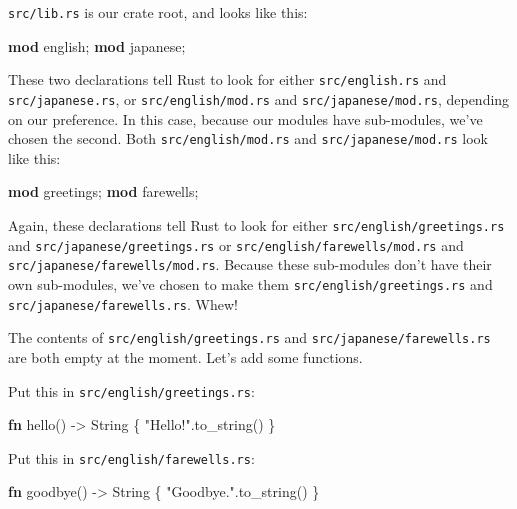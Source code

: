 \documentclass[a4paper,]{book}
\newenvironment{Shaded}{\begin{snugshade}}{\end{snugshade}}
\newcommand{\KeywordTok}[1]{\textcolor[rgb]{0.13,0.29,0.53}{\textbf{{#1}}}}
\newcommand{\StringTok}[1]{\textcolor[rgb]{0.31,0.60,0.02}{{#1}}}
\newcommand{\NormalTok}[1]{{#1}}
\begin{document}
\texttt{src/lib.rs} is our crate root, and looks like this:

\begin{Shaded}
\begin{Highlighting}[]
\KeywordTok{mod} \NormalTok{english;}
\KeywordTok{mod} \NormalTok{japanese;}
\end{Highlighting}
\end{Shaded}

These two declarations tell Rust to look for either
\texttt{src/english.rs} and \texttt{src/japanese.rs}, or
\texttt{src/english/mod.rs} and \texttt{src/japanese/mod.rs}, depending
on our preference. In this case, because our modules have sub-modules,
we've chosen the second. Both \texttt{src/english/mod.rs} and
\texttt{src/japanese/mod.rs} look like this:

\begin{Shaded}
\begin{Highlighting}[]
\KeywordTok{mod} \NormalTok{greetings;}
\KeywordTok{mod} \NormalTok{farewells;}
\end{Highlighting}
\end{Shaded}

Again, these declarations tell Rust to look for either
\texttt{src/english/greetings.rs} and \texttt{src/japanese/greetings.rs}
or \texttt{src/english/farewells/mod.rs} and
\texttt{src/japanese/farewells/mod.rs}. Because these sub-modules don't
have their own sub-modules, we've chosen to make them
\texttt{src/english/greetings.rs} and
\texttt{src/japanese/farewells.rs}. Whew!

The contents of \texttt{src/english/greetings.rs} and
\texttt{src/japanese/farewells.rs} are both empty at the moment. Let's
add some functions.

Put this in \texttt{src/english/greetings.rs}:

\begin{Shaded}
\begin{Highlighting}[]
\KeywordTok{fn} \NormalTok{hello() -> String \{}
    \StringTok{"Hello!"}\NormalTok{.to_string()}
\NormalTok{\}}
\end{Highlighting}
\end{Shaded}

Put this in \texttt{src/english/farewells.rs}:

\begin{Shaded}
\begin{Highlighting}[]
\KeywordTok{fn} \NormalTok{goodbye() -> String \{}
    \StringTok{"Goodbye."}\NormalTok{.to_string()}
\NormalTok{\}}
\end{Highlighting}
\end{Shaded}
\end{document}
